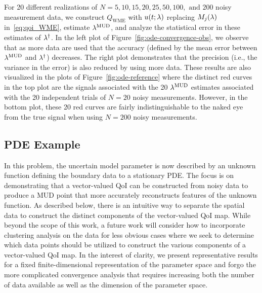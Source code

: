 For 20 different realizations of $N=5, 10, 15, 20, 25, 50, 100, \text{ and } 200$ noisy measurement data, we construct $Q_\text{WME}$ with $u(t;\lambda)$ replacing $M_j(\lambda)$ in~\eqref{eq:qoi_WME}, estimate $\lambda^{\text{MUD}}$, and analyze the statistical error in these estimates of $\lambda^\dagger$.
In the left plot of Figure~\ref{fig:ode-convergence-obs}, we observe that as more data are used that the accuracy (defined by the mean error between $\lambda^{\text{MUD}}$ and $\lambda^\dagger$) decreases.
The right plot demonstrates that the precision (i.e., the variance in the error) is also reduced by using more data.
These results are also visualized in the plots of Figure~\ref{fig:ode-reference} where the distinct red curves in the top plot are the signals associated with the 20 $\lambda^{\text{MUD}}$ estimates associated with the 20 independent trials of $N=20$ noisy measurements.
However, in the bottom plot, these 20 red curves are fairly indistinguishable to the naked eye from the true signal when using $N=200$ noisy measurements.

\subsection{PDE Example}\label{subsec:pde-example}

In this problem, the uncertain model parameter is now described by an unknown function defining the boundary data to a stationary PDE.
The focus is on demonstrating that a vector-valued QoI can be constructed from noisy data to produce a MUD point that more accurately reconstructs features of the unknown function.
As described below, there is an intuitive way to separate the spatial data to construct the distinct components of the vector-valued QoI map.
While beyond the scope of this work, a future work will consider how to incorporate clustering analysis on the data for less obvious cases where we seek to determine which data points should be utilized to construct the various components of a vector-valued QoI map.
In the interest of clarity, we present representative results for a fixed finite-dimensional representation of the parameter space and forgo the more complicated convergence analysis that requires increasing both the number of data available as well as the dimension of the parameter space.

